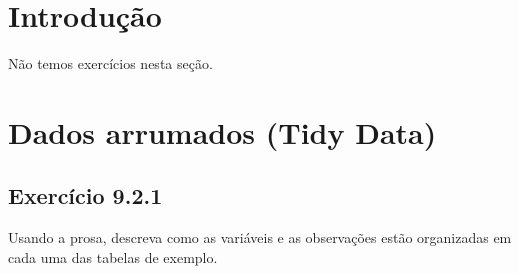 \documentclass[
]{latex/krantz}
\theoremstyle{definition}
\theoremstyle{definition}
\theoremstyle{definition}
\theoremstyle{definition}
\theoremstyle{remark}
\begin{document}
\hypertarget{introduuxe7uxe3o-5}{%
\section{Introdução}\label{introduuxe7uxe3o-5}}

Não temos exercícios nesta seção.

\hypertarget{dados-arrumados-tidy-data}{%
\section{Dados arrumados (Tidy Data)}\label{dados-arrumados-tidy-data}}

\hypertarget{exr9-2-1}{%
\subsection*{Exercício 9.2.1}\label{exr9-2-1}}

Usando a prosa, descreva como as variáveis e as observações estão organizadas em cada uma das tabelas de exemplo.
\end{document}
